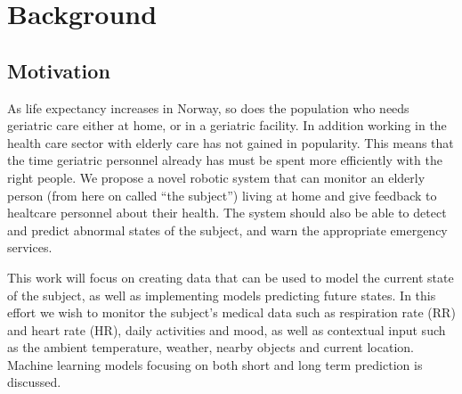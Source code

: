 \chapter{Background}

\section{Motivation}
As life expectancy increases in Norway, so does the population who needs geriatric care either at home, or in a geriatric facility. In addition working in the health care sector with elderly care has not gained in popularity. This means that the time geriatric personnel already has must be spent more efficiently with the right people. We propose a novel robotic system that can monitor an elderly person (from here on called ``the subject'') living at home and give feedback to healtcare personnel about their health. The system should also be able to detect and predict abnormal states of the subject, and warn the appropriate emergency services.

This work will focus on creating data that can be used to model the current state of the subject, as well as implementing models predicting future states. In this effort we wish to monitor the subject's medical data such as respiration rate (RR) and heart rate (HR), daily activities and mood, as well as  contextual input such as the ambient temperature, weather, nearby objects and current location. Machine learning models focusing on both short and long term prediction is discussed. 













